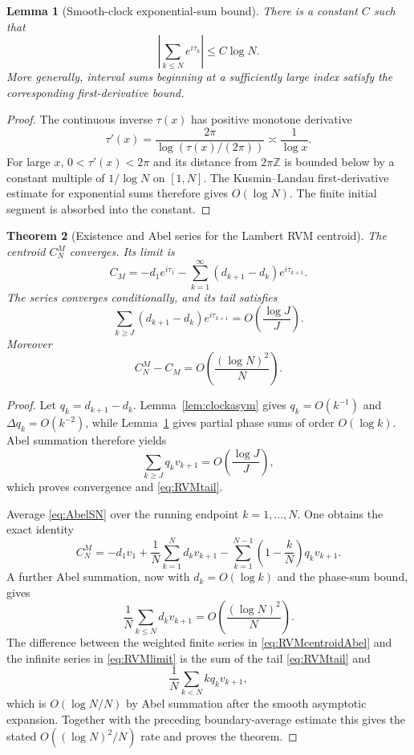 \documentclass[11pt]{amsart}
\numberwithin{equation}{section}
\newtheorem{theorem}{Theorem}[section]
\newtheorem{lemma}[theorem]{Lemma}
\theoremstyle{definition}
\theoremstyle{remark}
\begin{document}
\begin{lemma}[Smooth-clock exponential-sum bound]\label{lem:KL}
There is a constant $C$ such that
\[
\left|\sum_{k\le N}e^{i\tau_k}\right|\le C\log N.
\]
More generally, interval sums beginning at a sufficiently large index satisfy the corresponding first-derivative bound.
\end{lemma}
\begin{proof}
The continuous inverse $\tau(x)$ has positive monotone derivative
\[
\tau'(x)=\frac{2\pi}{\log(\tau(x)/(2\pi))}\asymp\frac1{\log x}.
\]
For large $x$, $0<\tau'(x)<2\pi$ and its distance from $2\pi\mathbb Z$ is bounded below by a constant multiple of $1/\log N$ on $[1,N]$. The Kusmin--Landau first-derivative estimate for exponential sums therefore gives $O(\log N)$. The finite initial segment is absorbed into the constant.
\end{proof}

\begin{theorem}[Existence and Abel series for the Lambert RVM centroid]\label{thm:RVMlimit}
The centroid $C_N^M$ converges. Its limit is
\begin{equation}\label{eq:RVMlimit}
\boxed{
C_M=-d_1e^{i\tau_1}
-\sum_{k=1}^{\infty}(d_{k+1}-d_k)e^{i\tau_{k+1}}.
}
\end{equation}
The series converges conditionally, and its tail satisfies
\begin{equation}\label{eq:RVMtail}
\sum_{k\ge J}(d_{k+1}-d_k)e^{i\tau_{k+1}}
=O\!\left(\frac{\log J}{J}\right).
\end{equation}
Moreover
\[
C_N^M-C_M=O\!\left(\frac{(\log N)^2}{N}\right).
\]
\end{theorem}
\begin{proof}
Let $q_k=d_{k+1}-d_k$. Lemma~\ref{lem:clockasym} gives $q_k=O(k^{-1})$ and $\Delta q_k=O(k^{-2})$, while Lemma~\ref{lem:KL} gives partial phase sums of order $O(\log k)$. Abel summation therefore yields
\[
\sum_{k\ge J}q_kv_{k+1}
=O\!\left(\frac{\log J}{J}\right),
\]
which proves convergence and \eqref{eq:RVMtail}.

Average \eqref{eq:AbelSN} over the running endpoint $k=1,\ldots,N$. One obtains the exact identity
\begin{equation}\label{eq:RVMcentroidAbel}
C_N^M
=-d_1v_1
+\frac1N\sum_{k=1}^N d_kv_{k+1}
-\sum_{k=1}^{N-1}\left(1-\frac{k}{N}\right)q_kv_{k+1}.
\end{equation}
A further Abel summation, now with $d_k=O(\log k)$ and the phase-sum bound, gives
\[
\frac1N\sum_{k\le N}d_kv_{k+1}=O\!\left(\frac{(\log N)^2}{N}\right).
\]
The difference between the weighted finite series in \eqref{eq:RVMcentroidAbel} and the infinite series in \eqref{eq:RVMlimit} is the sum of the tail \eqref{eq:RVMtail} and
\[
\frac1N\sum_{k<N}k q_kv_{k+1},
\]
which is $O(\log N/N)$ by Abel summation after the smooth asymptotic expansion. Together with the preceding boundary-average estimate this gives the stated $O((\log N)^2/N)$ rate and proves the theorem.
\end{proof}
\end{document}
